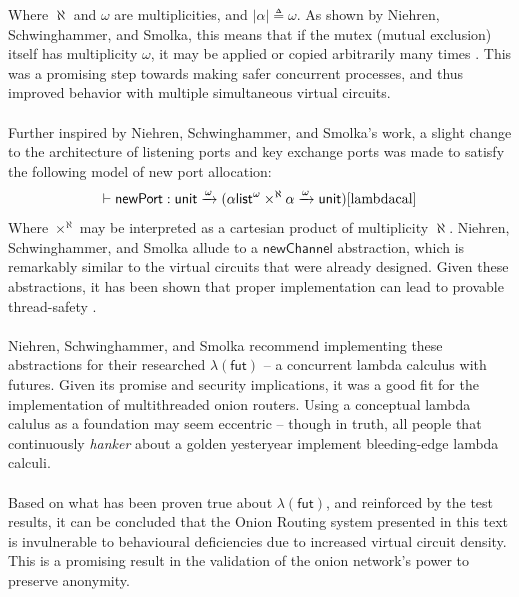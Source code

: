 \documentclass[10pt]{report}
\begin{document}
Where $\aleph$ and $\omega$ are multiplicities, and $|\alpha|\triangleq \omega$. As shown by
Niehren, Schwinghammer, and Smolka, this means that if
the mutex (mutual exclusion) itself has multiplicity $\omega$, it may be applied or copied
arbitrarily many times \cite{lambdacal}. This was a promising step towards making safer concurrent
processes, and thus improved behavior with multiple simultaneous virtual circuits.\\\\
Further inspired by Niehren, Schwinghammer, and Smolka's work, a slight change to the architecture of
listening ports and key exchange ports was made to satisfy the following model of new port
allocation:
\begin{equation}
	\vdash\mathsf{newPort}:\mathsf{unit}\xrightarrow{\omega}(\alpha\mathsf{list}^{\omega}\times^{\aleph}\alpha\xrightarrow{\omega}\mathsf{unit})\cite{lambdacal}
\end{equation}
Where $\times^{\aleph}$ may be interpreted as a cartesian product of multiplicity $\aleph$. Niehren,
Schwinghammer, and Smolka allude to a $\mathsf{newChannel}$ abstraction, which is remarkably similar
to the virtual circuits that were already designed. Given these abstractions, it has been shown that
proper implementation can lead to provable thread-safety \cite{lambdacal}.\\\\
Niehren, Schwinghammer, and Smolka recommend implementing these abstractions for their researched
$\lambda(\mathsf{fut})$ -- a concurrent lambda calculus with futures. Given its promise and security
implications, it was a good fit for the implementation of multithreaded onion routers. Using a
conceptual lambda calulus as a foundation may seem eccentric -- though in truth, all people that
continuously \textit{hanker} about a golden yesteryear implement bleeding-edge lambda calculi.\\\\
Based on what has been proven true about $\lambda(\mathsf{fut})$, and reinforced by the test
results, it can be concluded that the Onion Routing system presented in this text is invulnerable to
behavioural deficiencies due to increased virtual circuit density. This is a promising result in the
validation of the onion network's power to preserve anonymity.
\end{document}
